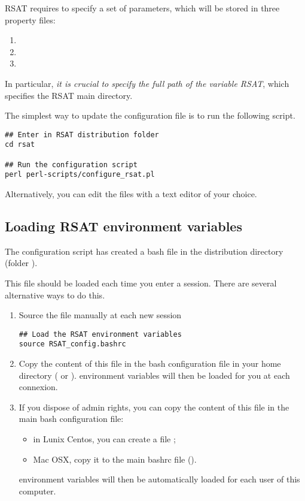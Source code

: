 \documentclass[12pt,a4paper, oneside]{scrreprt} %
\begin{document}
RSAT requires to specify a set of parameters, which will be stored in
three property files:
\begin{enumerate}
\item  {}
\item  {}
\item  {}
\end{enumerate}

In particular, \emph{it is crucial to specify the full path of the
  variable RSAT}, which specifies the RSAT main directory.

The simplest way to update the configuration file is to run the
following script.

\begin{lstlisting}
## Enter in RSAT distribution folder
cd rsat

## Run the configuration script
perl perl-scripts/configure_rsat.pl
\end{lstlisting}

Alternatively, you can edit the files with a text editor of your
choice.

\subsection{Loading RSAT environment variables}

The configuration script has created a bash file
 in the \RSAT distribution directory (folder
). 

This file should be loaded each time you enter a session. There are
several alternative ways to do this.

\begin{enumerate}

\item Source the file manually at each new session

\begin{lstlisting}
## Load the RSAT environment variables
source RSAT_config.bashrc
\end{lstlisting}

\item Copy the content of this file in the bash configuration file in
  your home directory ( or
  ). \RSAT environment variables will then be
  loaded for you at each connexion.

\item If you dispose of admin rights, you can copy the content of this
  file in the main bash configuration file: 
  \begin {itemize}
  \item in Lunix Centos, you can create a file
    ; 
  \item Mac OSX, copy it to the main bashrc file ().
  \end{itemize}
  \RSAT environment variables will then be automatically loaded for
  each user of this computer.
\end{enumerate}
\end{document}
